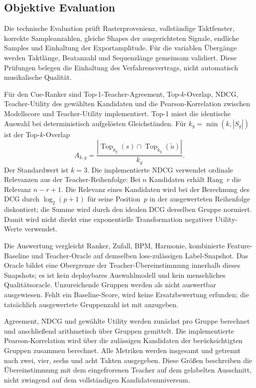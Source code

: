 \subsection{Objektive Evaluation}
\label{sec:methodik-evaluation}

Die technische Evaluation prüft Rasterprovenienz, vollständige Taktfenster, korrekte Sampleanzahlen, gleiche Shapes der ausgerichteten Signale, endliche Samples und Einhaltung der Exportamplitude. Für die variablen Übergänge werden Taktlänge, Beatanzahl und Sequenzlänge gemeinsam validiert. Diese Prüfungen belegen die Einhaltung des Verfahrensvertrags, nicht automatisch musikalische Qualität.

Für den Cue-Ranker sind Top-1-Teacher-Agreement, Top-$k$-Overlap, NDCG, Teacher-Utility des gewählten Kandidaten und die Pearson-Korrelation zwischen Modellscore und Teacher-Utility implementiert. Top-1 misst die identische Auswahl bei deterministisch aufgelösten Gleichständen. Für $k_g=\min(k,|S_g|)$ ist der Top-$k$-Overlap
\begin{equation}
 A_{k,g}=\frac{|\operatorname{Top}_{k_g}(s)\cap
                       \operatorname{Top}_{k_g}(\tilde u)|}{k_g}.
\end{equation}
Der Standardwert ist $k=3$. Die implementierte NDCG verwendet ordinale Relevanzen aus der Teacher-Reihenfolge: Bei $n$ Kandidaten erhält Rang~$r$ die Relevanz $n-r+1$. Die Relevanz eines Kandidaten wird bei der Berechnung des DCG durch $\log_2(p+1)$ für seine Position~$p$ in der ausgewerteten Reihenfolge diskontiert; die Summe wird durch den idealen DCG derselben Gruppe normiert. Damit wird nicht direkt eine exponentielle Transformation negativer Utility-Werte verwendet.

Die Auswertung vergleicht Ranker, Zufall, BPM, Harmonie, kombinierte Feature-Baseline und Teacher-Oracle auf demselben loss-zulässigen Label-Snapshot. Das Oracle bildet eine Obergrenze der Teacher-Übereinstimmung innerhalb dieses Snapshots; es ist kein deploybares Auswahlmodell und kein menschliches Qualitätsoracle. Unzureichende Gruppen werden als nicht auswertbar ausgewiesen. Fehlt ein Baseline-Score, wird keine Ersatzbewertung erfunden; die tatsächlich ausgewertete Gruppenzahl ist mit anzugeben.

Agreement, NDCG und gewählte Utility werden zunächst pro Gruppe berechnet und anschließend arithmetisch über Gruppen gemittelt. Die implementierte Pearson-Korrelation wird über die zulässigen Kandidaten der berücksichtigten Gruppen zusammen berechnet. Alle Metriken werden insgesamt und getrennt nach zwei, vier, sechs und acht Takten ausgegeben. Diese Größen beschreiben die Übereinstimmung mit dem eingefrorenen Teacher auf dem gelabelten Ausschnitt, nicht zwingend auf dem vollständigen Kandidatenuniversum.

